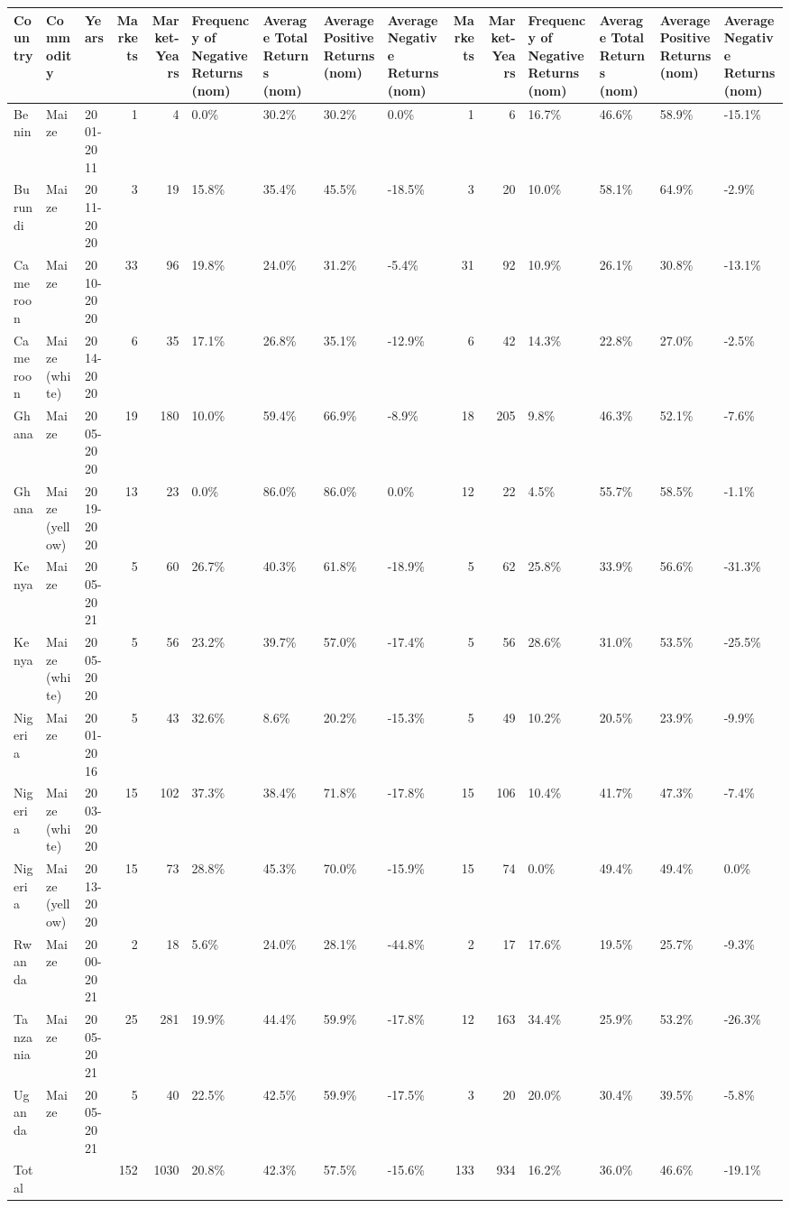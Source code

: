 \begin{table}[ht]
\centering
\begin{tabular}{lllrrllllrrllll}
  \hline
Country & Commodity & Years & Markets & Market-Years & Frequency of Negative Returns (nom) & Average Total Returns (nom) & Average Positive Returns (nom) & Average Negative Returns (nom) & Markets & Market-Years & Frequency of Negative Returns (nom) & Average Total Returns (nom) & Average Positive Returns (nom) & Average Negative Returns (nom) \\ 
  \hline
Benin & Maize & 2001-2011 &   1 &   4 & 0.0\% & 30.2\% & 30.2\% & 0.0\% &   1 &   6 & 16.7\% & 46.6\% & 58.9\% & -15.1\% \\ 
  Burundi & Maize & 2011-2020 &   3 &  19 & 15.8\% & 35.4\% & 45.5\% & -18.5\% &   3 &  20 & 10.0\% & 58.1\% & 64.9\% & -2.9\% \\ 
  Cameroon & Maize & 2010-2020 &  33 &  96 & 19.8\% & 24.0\% & 31.2\% & -5.4\% &  31 &  92 & 10.9\% & 26.1\% & 30.8\% & -13.1\% \\ 
  Cameroon & Maize (white) & 2014-2020 &   6 &  35 & 17.1\% & 26.8\% & 35.1\% & -12.9\% &   6 &  42 & 14.3\% & 22.8\% & 27.0\% & -2.5\% \\ 
  Ghana & Maize & 2005-2020 &  19 & 180 & 10.0\% & 59.4\% & 66.9\% & -8.9\% &  18 & 205 & 9.8\% & 46.3\% & 52.1\% & -7.6\% \\ 
  Ghana & Maize (yellow) & 2019-2020 &  13 &  23 & 0.0\% & 86.0\% & 86.0\% & 0.0\% &  12 &  22 & 4.5\% & 55.7\% & 58.5\% & -1.1\% \\ 
  Kenya & Maize & 2005-2021 &   5 &  60 & 26.7\% & 40.3\% & 61.8\% & -18.9\% &   5 &  62 & 25.8\% & 33.9\% & 56.6\% & -31.3\% \\ 
  Kenya & Maize (white) & 2005-2020 &   5 &  56 & 23.2\% & 39.7\% & 57.0\% & -17.4\% &   5 &  56 & 28.6\% & 31.0\% & 53.5\% & -25.5\% \\ 
  Nigeria & Maize & 2001-2016 &   5 &  43 & 32.6\% & 8.6\% & 20.2\% & -15.3\% &   5 &  49 & 10.2\% & 20.5\% & 23.9\% & -9.9\% \\ 
  Nigeria & Maize (white) & 2003-2020 &  15 & 102 & 37.3\% & 38.4\% & 71.8\% & -17.8\% &  15 & 106 & 10.4\% & 41.7\% & 47.3\% & -7.4\% \\ 
  Nigeria & Maize (yellow) & 2013-2020 &  15 &  73 & 28.8\% & 45.3\% & 70.0\% & -15.9\% &  15 &  74 & 0.0\% & 49.4\% & 49.4\% & 0.0\% \\ 
  Rwanda & Maize & 2000-2021 &   2 &  18 & 5.6\% & 24.0\% & 28.1\% & -44.8\% &   2 &  17 & 17.6\% & 19.5\% & 25.7\% & -9.3\% \\ 
  Tanzania & Maize & 2005-2021 &  25 & 281 & 19.9\% & 44.4\% & 59.9\% & -17.8\% &  12 & 163 & 34.4\% & 25.9\% & 53.2\% & -26.3\% \\ 
  Uganda & Maize & 2005-2021 &   5 &  40 & 22.5\% & 42.5\% & 59.9\% & -17.5\% &   3 &  20 & 20.0\% & 30.4\% & 39.5\% & -5.8\% \\ 
  Total &  &  & 152 & 1030 & 20.8\% & 42.3\% & 57.5\% & -15.6\% & 133 & 934 & 16.2\% & 36.0\% & 46.6\% & -19.1\% \\ 
   \hline
\end{tabular}
\end{table}
